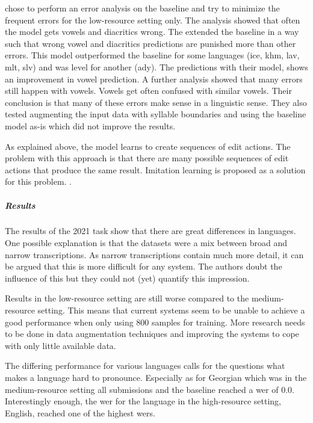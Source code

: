\citet{lo-nicolai-2021-linguistic} chose to perform an error analysis on the baseline and try to minimize the frequent errors for the low-resource setting only. The analysis showed that often the model gets vowels and diacritics wrong. The extended the baseline in a way such that wrong vowel and diacritics predictions are punished more than other errors. This model outperformed the baseline for some languages (ice, khm, lav, mlt, slv) and was level for another (ady). The predictions with their model, shows an improvement in vowel prediction. A further analysis showed that many errors still happen with vowels. Vowels get often confused with similar vowels. Their conclusion is that many of these errors make sense in a linguistic sense.   
They also tested augmenting the input data with syllable boundaries and using the baseline model as-is which did not improve the results. 

As explained above, the model learns to create sequences of edit actions. The problem with this approach is that there are many possible sequences of edit actions that produce the same result. Imitation learning is proposed as a solution for this problem. . 

\subparagraph{Results}
The results of the 2021 task show that there are great differences in languages. One possible explanation is that the datasets were a mix between broad and narrow transcriptions. As narrow transcriptions contain much more detail, it can be argued that this is more difficult for any system. The authors doubt the influence of this but they could not (yet) quantify this impression. 

Results in the low-resource setting are still worse compared to the medium-resource setting. This means that current systems seem to be unable to achieve a good performance when only using 800 samples for training. More research needs to be done in data augmentation techniques and improving the systems to cope with only little available data.

The differing performance for various languages calls for the questions what makes a language hard to pronounce. Especially as for Georgian which was in the medium-resource setting all submissions and the baseline reached a \ac{wer} of $0.0$. Interestingly enough, the \ac{wer} for the language in the high-resource setting, English, reached one of the highest \ac{wer}s.

